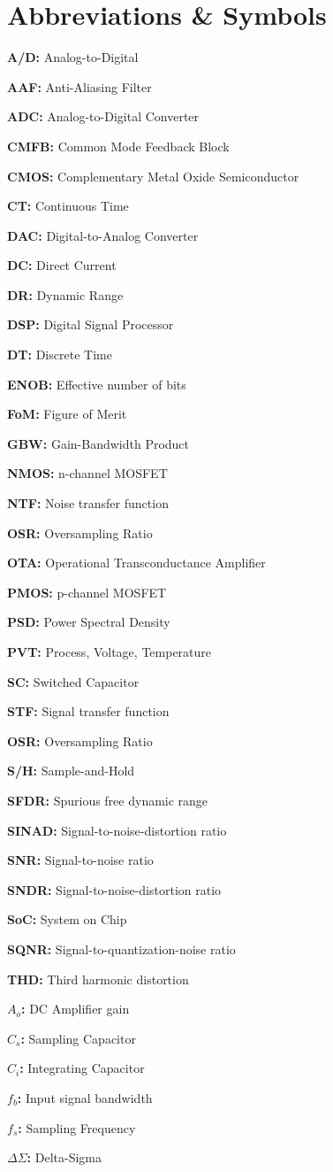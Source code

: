 \chapter*{Abbreviations \& Symbols}


\textbf{A/D:} Analog-to-Digital 


\textbf{AAF:} Anti-Aliasing Filter  


\textbf{ADC:} Analog-to-Digital Converter  


\textbf{CMFB:} Common Mode Feedback Block  

\textbf{CMOS:} Complementary Metal Oxide Semiconductor  


\textbf{CT:} Continuous Time  


\textbf{DAC:} Digital-to-Analog Converter  


\textbf{DC:} Direct Current

\textbf{DR:} Dynamic Range

\textbf{DSP:} Digital Signal Processor

\textbf{DT:} Discrete Time

\textbf{ENOB:} Effective number of bits

\textbf{FoM:} Figure of Merit

\textbf{GBW:} Gain-Bandwidth Product

\textbf{NMOS:} n-channel MOSFET

\textbf{NTF:} Noise transfer function

\textbf{OSR:} Oversampling Ratio

\textbf{OTA:} Operational Transconductance Amplifier

\textbf{PMOS:} p-channel MOSFET

\textbf{PSD:} Power Spectral Density

\textbf{PVT:} Process, Voltage, Temperature

\textbf{SC:} Switched Capacitor

\textbf{STF:} Signal transfer function

\textbf{OSR:} Oversampling Ratio

\textbf{S/H:} Sample-and-Hold

\textbf{SFDR:} Spurious free dynamic range

\textbf{SINAD:} Signal-to-noise-distortion ratio

\textbf{SNR:} Signal-to-noise ratio

\textbf{SNDR:} Signal-to-noise-distortion ratio

\textbf{SoC:} System on Chip

\textbf{SQNR:} Signal-to-quantization-noise ratio

\textbf{THD:} Third harmonic distortion

\textbf{$A_o$:} DC Amplifier gain

\textbf{$C_s$:} Sampling Capacitor

\textbf{$C_i$:} Integrating Capacitor

\textbf{$f_b$:} Input signal bandwidth

\textbf{$f_s$:} Sampling Frequency

\textbf{$\Delta\Sigma$:} Delta-Sigma


